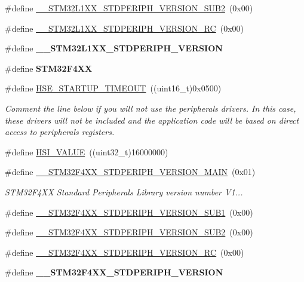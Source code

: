 \begin{DoxyCompactItemize}
\item 
\#define \hyperlink{group___library__configuration__section_ga0c6790058c040671530172ceab0539ae}{\-\_\-\-\_\-\-S\-T\-M32\-L1\-X\-X\-\_\-\-S\-T\-D\-P\-E\-R\-I\-P\-H\-\_\-\-V\-E\-R\-S\-I\-O\-N\-\_\-\-S\-U\-B2}~(0x00)
\item 
\#define \hyperlink{group___library__configuration__section_ga9b820cf9de6dad3c37f67f2bc1d04509}{\-\_\-\-\_\-\-S\-T\-M32\-L1\-X\-X\-\_\-\-S\-T\-D\-P\-E\-R\-I\-P\-H\-\_\-\-V\-E\-R\-S\-I\-O\-N\-\_\-\-R\-C}~(0x00)
\item 
\#define {\bfseries \-\_\-\-\_\-\-S\-T\-M32\-L1\-X\-X\-\_\-\-S\-T\-D\-P\-E\-R\-I\-P\-H\-\_\-\-V\-E\-R\-S\-I\-O\-N}
\item 
\hypertarget{group___library__configuration__section_ga252742cf70ce5210bc8817d386abced6}{\#define {\bfseries S\-T\-M32\-F4\-X\-X}}\label{group___library__configuration__section_ga252742cf70ce5210bc8817d386abced6}

\item 
\#define \hyperlink{group___library__configuration__section_ga68ecbc9b0a1a40a1ec9d18d5e9747c4f}{H\-S\-E\-\_\-\-S\-T\-A\-R\-T\-U\-P\-\_\-\-T\-I\-M\-E\-O\-U\-T}~((uint16\-\_\-t)0x0500)
\begin{DoxyCompactList}\small\item\em Comment the line below if you will not use the peripherals drivers. In this case, these drivers will not be included and the application code will be based on direct access to peripherals registers. \end{DoxyCompactList}\item 
\#define \hyperlink{group___library__configuration__section_gaaa8c76e274d0f6dd2cefb5d0b17fbc37}{H\-S\-I\-\_\-\-V\-A\-L\-U\-E}~((uint32\-\_\-t)16000000)
\item 
\#define \hyperlink{group___library__configuration__section_gab16ffe03509714c63d5e530131c494f4}{\-\_\-\-\_\-\-S\-T\-M32\-F4\-X\-X\-\_\-\-S\-T\-D\-P\-E\-R\-I\-P\-H\-\_\-\-V\-E\-R\-S\-I\-O\-N\-\_\-\-M\-A\-I\-N}~(0x01)
\begin{DoxyCompactList}\small\item\em S\-T\-M32\-F4\-X\-X Standard Peripherals Library version number V1... \end{DoxyCompactList}\item 
\#define \hyperlink{group___library__configuration__section_gadce716e810a51b042298fb21b63e5366}{\-\_\-\-\_\-\-S\-T\-M32\-F4\-X\-X\-\_\-\-S\-T\-D\-P\-E\-R\-I\-P\-H\-\_\-\-V\-E\-R\-S\-I\-O\-N\-\_\-\-S\-U\-B1}~(0x00)
\item 
\#define \hyperlink{group___library__configuration__section_ga4b16607e43a35289dc5ebb608b1261d4}{\-\_\-\-\_\-\-S\-T\-M32\-F4\-X\-X\-\_\-\-S\-T\-D\-P\-E\-R\-I\-P\-H\-\_\-\-V\-E\-R\-S\-I\-O\-N\-\_\-\-S\-U\-B2}~(0x00)
\item 
\#define \hyperlink{group___library__configuration__section_gad5bec5e54ac96b9238a6363f2088f85c}{\-\_\-\-\_\-\-S\-T\-M32\-F4\-X\-X\-\_\-\-S\-T\-D\-P\-E\-R\-I\-P\-H\-\_\-\-V\-E\-R\-S\-I\-O\-N\-\_\-\-R\-C}~(0x00)
\item 
\#define {\bfseries \-\_\-\-\_\-\-S\-T\-M32\-F4\-X\-X\-\_\-\-S\-T\-D\-P\-E\-R\-I\-P\-H\-\_\-\-V\-E\-R\-S\-I\-O\-N}
\end{DoxyCompactItemize}


